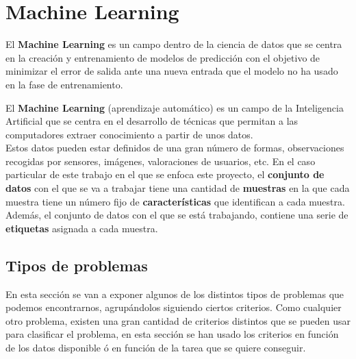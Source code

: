 \chapter{Machine Learning}
El \textbf{Machine Learning} es un campo dentro de la ciencia de datos que se centra en la creación y entrenamiento de modelos de predicción con el objetivo de minimizar el error de salida ante una nueva entrada que el modelo no ha usado en la fase de entrenamiento.

El \textbf{Machine Learning} (aprendizaje automático) es un campo de la Inteligencia Artificial que se centra en el desarrollo de técnicas que permitan a las computadores extraer conocimiento a partir de unos datos.\\
\linebreak
Estos datos pueden estar definidos de una gran número de formas, observaciones recogidas por sensores, imágenes, valoraciones de usuarios, etc. En el caso particular de este trabajo en el que se enfoca este proyecto, el \textbf{conjunto de datos} con el que se va a trabajar tiene una cantidad de \textbf{muestras} en la que cada muestra tiene un número fijo de \textbf{características} que identifican a cada muestra. Además, el conjunto de datos con el que se está trabajando, contiene una serie de \textbf{etiquetas} asignada a cada muestra.\\
\linebreak
\section{Tipos de problemas}
En esta sección se van a exponer algunos de los distintos tipos de problemas que podemos encontrarnos, agrupándolos siguiendo ciertos criterios. Como cualquier otro problema, existen una gran cantidad de criterios distintos que se pueden usar para clasificar el problema, en esta sección se han usado los criterios en función de los datos disponible ó en función de la tarea que se quiere conseguir.
